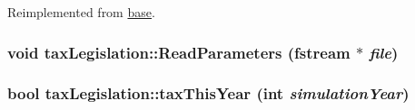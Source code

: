 Reimplemented from \hyperlink{classbase_ad2f5f5c9ec517641f63e52646cf49ad9}{base}.\hypertarget{classtax_legislation_a36da77119116d76049ca5055659720d7}{
\subsubsection[{ReadParameters}]{\setlength{\rightskip}{0pt plus 5cm}void taxLegislation::ReadParameters (fstream $\ast$ {\em file})}}
\label{classtax_legislation_a36da77119116d76049ca5055659720d7}
\hypertarget{classtax_legislation_ae011ae3ec63f87d1b67fcb5a51821f81}{
\subsubsection[{taxThisYear}]{\setlength{\rightskip}{0pt plus 5cm}bool taxLegislation::taxThisYear (int {\em simulationYear})}}
\label{classtax_legislation_ae011ae3ec63f87d1b67fcb5a51821f81}


